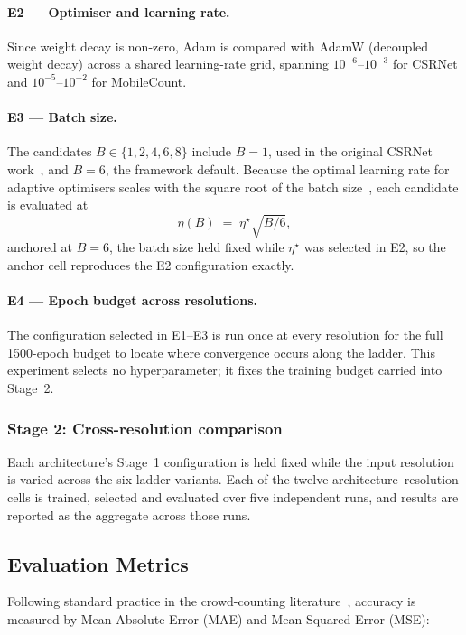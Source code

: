 \documentclass[conference]{IEEEtran}
\begin{document}
\paragraph{E2 --- Optimiser and learning rate.}
Since weight decay is non-zero, Adam is compared with AdamW (decoupled weight
decay) across a shared learning-rate grid, spanning $10^{-6}$--$10^{-3}$ for
CSRNet and $10^{-5}$--$10^{-2}$ for MobileCount.

\paragraph{E3 --- Batch size.}
The candidates $B\in\{1,2,4,6,8\}$ include $B=1$, used in the original CSRNet
work~\cite{li2018csrnet}, and $B=6$, the framework default. Because the optimal
learning rate for adaptive optimisers scales with the square root of the batch
size~\cite{malladi2022sdes}, each candidate is evaluated at
\begin{equation}
    \eta(B) \;=\; \eta^\star\sqrt{B/6},
    \label{eq:lr_batch_scaling}
\end{equation}
anchored at $B=6$, the batch size held fixed while $\eta^\star$ was selected in
E2, so the anchor cell reproduces the E2 configuration exactly.

\paragraph{E4 --- Epoch budget across resolutions.}
The configuration selected in E1--E3 is run once at every resolution for the
full 1500-epoch budget to locate where convergence occurs along the ladder.
This experiment selects no hyperparameter; it fixes the training budget carried
into Stage~2.

\subsubsection{Stage 2: Cross-resolution comparison}
Each architecture's Stage~1 configuration is held fixed while the input
resolution is varied across the six ladder variants. Each of the twelve
architecture--resolution cells is trained, selected and evaluated over five
independent runs, and results are reported as the aggregate across those runs.

\subsection{Evaluation Metrics}
\label{sec:eval_metrics}
Following standard practice in the crowd-counting
literature~\cite{gao2020crowdcountingsurvey, li2018csrnet}, accuracy is measured
by Mean Absolute Error (MAE) and Mean Squared Error (MSE):
\end{document}
